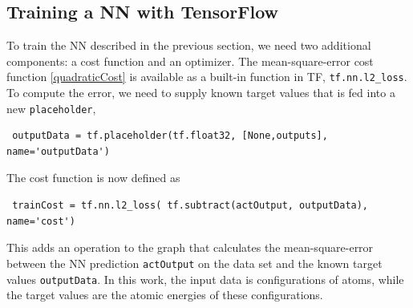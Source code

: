 \documentclass[twoside,english]{uiofysmaster}
\begin{document}
\subsection{Training a NN with TensorFlow}
To train the NN described in the previous section, we need two additional components:
a cost function and an optimizer. The mean-square-error cost function \eqref{quadraticCost} is available as a 
built-in function in TF, \texttt{tf.nn.l2\_loss}. To compute the error, we need to supply known 
target values that is fed into a new \texttt{placeholder},
\begin{verbatim}
 outputData = tf.placeholder(tf.float32, [None,outputs], name='outputData')
\end{verbatim}
The cost function is now defined as
\begin{verbatim}
 trainCost = tf.nn.l2_loss( tf.subtract(actOutput, outputData), name='cost')
\end{verbatim}
This adds an operation to the graph that calculates the mean-square-error between the NN prediction \texttt{actOutput}
on the data set
and the known target values \texttt{outputData}. In this work, the input data is configurations of atoms, 
while the target values are the atomic energies of these configurations. 
\end{document}
